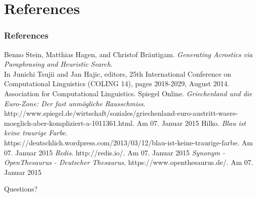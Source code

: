 \documentclass{beamer}
\begin{document}
\section{References}

\begin{frame}
\frametitle{References}
\scriptsize
\begin{thebibliography}{1}
	Benno Stein, Matthias Hagen, and Christof Bräutigam. \emph{Generating Acrostics via Paraphrasing and Heuristic Search}. \\
	In Junichi Tsujii and Jan Hajic, editors, 25th International Conference on Computational Linguistics (COLING 14), pages 2018-2029, August 2014. Association for Computational Linguistics.
	Spiegel Online. \emph{Griechenland und die Euro-Zone: Der fast unmögliche Rausschmiss}. \\
	http://www.spiegel.de/wirtschaft/soziales/griechenland-euro-austritt-waere-moeglich-aber-kompliziert-a-1011361.html. Am 07. Januar 2015
	Hilko. \emph{Blau ist keine traurige Farbe}. \\
	https://deutschlich.wordpress.com/2013/03/12/blau-ist-keine-traurige-farbe. Am 07. Januar 2015
	\emph{Redis}. http://redis.io/. Am 07. Januar 2015
	\emph{Synonym - OpenThesaurus - Deutscher Thesaurus}. https://www.openthesaurus.de/. Am 07. Januar 2015
\end{thebibliography}
\end{frame}

\begin{frame}
\Huge{\centerline{Questions?}}
\end{frame}

\end{document}
